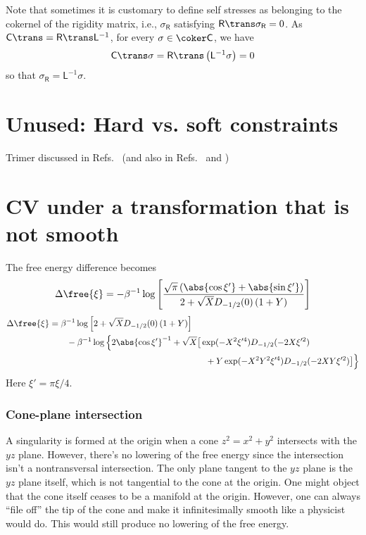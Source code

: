 Note that sometimes it is customary to define self stresses as belonging to the cokernel of the rigidity matrix, i.e., $\sigma_{\mathsf{R}}$ satisfying $\mathsf{R}\trans\sigma_{\mathsf{R}} = 0$.
As $\mathsf{C}\trans = \mathsf{R}\trans\mathsf{L}^{-1}$, for every $\sigma \in \coker\mathsf{C}$, we have
%
\begin{equation}
  \mathsf{C}\trans\sigma = \mathsf{R}\trans\left(\mathsf{L}^{-1}\mathsf{\sigma}\right) = 0
\end{equation}
%
so that $\sigma_{\mathsf{R}} = \mathsf{L}^{-1}\sigma$.




\section{Unused: Hard vs. soft constraints}

Trimer discussed in Refs.~\cite{kampen1981,kampen1984} (and also in Refs.~\cite[Section 15.1]{frenkel2001} and \cite{walter2011})

\section{CV under a transformation that is not smooth}

The free energy difference becomes
%
\begin{equation}
  \Delta\free{\xi} = -\beta^{-1}\log\left[\frac{\sqrt{\pi}\left(\abs{\cos\xi'} + \abs{\sin\xi'}\right)}{2 + \sqrt{X}D_{-1/2}(0)\left(1 + Y\right)}\right]
\end{equation}
\begin{equation}
  \begin{aligned}
    \Delta\free{\xi} &= \beta^{-1}\log\left[2 + \sqrt{X}D_{-1/2}(0)\left(1 + Y\right)\right] \\
                     &\qquad -\beta^{-1}\log\Big\{2\abs{\cos\xi'}^{-1} + \sqrt{X}\big[\exp(-X^{2}\xi'^{4})D_{-1/2}(-2X\xi'^{2})\\
                     & \phantom{\qquad-\beta^{-1}\log\Big\{2\abs{\cos\xi'}^{-1} + \sqrt{X}\big[}
                 \quad+Y\exp(-X^{2}Y^{2}\xi'^{4})D_{-1/2}(-2XY\xi'^{2})\big]\Big\}   \end{aligned}
\end{equation}
%
Here $\xi' = \pi\xi/4$.

\subsubsection{Cone-plane intersection}

A singularity is formed at the origin when a cone $z^2 = x^2 + y^2$ intersects with the $yz$ plane.
However, there's no lowering of the free energy since the intersection isn't a nontransversal intersection.
The only plane tangent to the $yz$ plane is the $yz$ plane itself, which is not tangential to the cone at the origin.
One might object that the cone itself ceases to be a manifold at the origin.
However, one can always ``file off'' the tip of the cone and make it infinitesimally smooth like a physicist would do.
This would still produce no lowering of the free energy.

